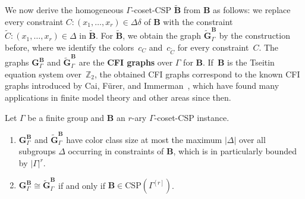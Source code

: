 \documentclass[a4paper,english, thm-restate]{lipics-v2021}
\newcommand{\defining}[1]{\textbf{#1}}
\newcommand{\iso}{\cong}
\newcommand{\CFIsym}{\mathbf{G}}
\newcommand{\CFIA}[2]{\CFIsym_{#1}^{#2}}
\newcommand{\CFIB}[2]{\widetilde{\CFIsym}_{#1}^{#2}}
\newcommand{\StructB}{\mathbf{B}}
\newcommand{\CSP}[1]{\mathrm{CSP}(#1)}
\newcommand{\bbZ}{\mathbb{Z}}
\newcommand{\CosetGrpTmplt}[2]{#1^{[#2]}}
\begin{document}
	We now derive the homogeneous $\Gamma$-coset-CSP $\tilde{\StructB}$ from
	$\StructB$ as follows:
	we replace every constraint $C \colon (x_1, \dots, x_r) \in \Delta\delta$ of $\StructB$
	with the constraint $\tilde{C} \colon (x_1, \dots, x_r) \in \Delta$ in $\tilde{\StructB}$.
	For $\tilde{\StructB}$, we obtain the graph $\CFIB{\Gamma}{\StructB}$
	by the construction before,
	where we identify the colors~$c_{C}$ and~$c_{\tilde{C}}$ for every constraint~$C$.
	The graphs $\CFIA{\Gamma}{\StructB}$ and $\CFIB{\Gamma}{\StructB}$
	are the \defining{CFI graphs} over $\Gamma$ for $\StructB$.
	If~$\StructB$ is the Tseitin equation system over~$\bbZ_2$,
	the obtained CFI graphs correspond to the known CFI graphs
	introduced by Cai, Fürer, and Immerman~\cite{CaiFuererImmerman1992},
	which have found many applications in finite model theory and other areas since then.
	\begin{lemma}
		\label{lem:cfi-basics}
		Let $\Gamma$ be a finite group and $\StructB$ an $r$-ary $\Gamma$-coset-CSP instance.
		\begin{enumerate}
			\item $\CFIA{\Gamma}{\StructB}$ and $\CFIB{\Gamma}{\StructB}$ have color class size at most the maximum $|\Delta|$ over all subgroups $\Delta$ occurring in constraints of $\StructB$,
			which is in particularly bounded by
			$|\Gamma|^r$.
			\item $\CFIA{\Gamma}{\StructB} \iso \CFIB{\Gamma}{\StructB}$ if and only if $\StructB \in \CSP{\CosetGrpTmplt{\Gamma}{r}}$.
		\end{enumerate}
	\end{lemma}
	
	
	
\end{document}
